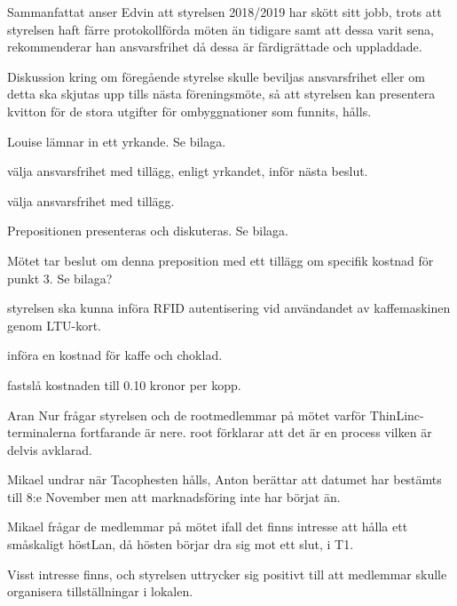 \documentclass{protokoll}
\begin{document}
Sammanfattat anser Edvin att styrelsen 2018/2019 har skött sitt jobb, trots att
styrelsen haft färre protokollförda möten än tidigare samt att dessa varit
sena, rekommenderar han ansvarsfrihet då dessa är färdigrättade och uppladdade. 


Diskussion kring om föregående styrelse skulle beviljas ansvarsfrihet eller om
detta ska skjutas upp tills nästa föreningsmöte, så att styrelsen kan 
presentera kvitton för de stora utgifter för ombyggnationer som funnits, hålls. 

Louise lämnar in ett yrkande. Se bilaga.

\begin{beslut}
  \att välja ansvarsfrihet med tillägg, enligt yrkandet, inför nästa beslut.
\end{beslut}

\begin{beslut}
  \att välja ansvarsfrihet med tillägg.
\end{beslut}

Prepositionen presenteras och diskuteras. Se bilaga. 


Mötet tar beslut om denna preposition med ett tillägg om specifik kostnad för
punkt 3. Se bilaga?

\begin{beslut}
  \att styrelsen ska kunna införa RFID autentisering vid användandet av
  kaffemaskinen genom LTU-kort.
\end{beslut}

\begin{beslut}
  \att införa en kostnad för kaffe och choklad.
\end{beslut}

\begin{beslut}
  \att fastslå kostnaden till 0.10 kronor per kopp.
\end{beslut}

Aran Nur frågar styrelsen och de rootmedlemmar på mötet varför
ThinLinc-terminalerna fortfarande är nere. root förklarar att det är en process
vilken är delvis avklarad. 

Mikael undrar när Tacophesten hålls, Anton berättar att datumet har bestämts
till 8:e November men att marknadsföring inte har börjat än. 

Mikael frågar de medlemmar på mötet ifall det finns intresse att hålla ett
småskaligt höstLan, då hösten börjar dra sig mot ett slut, i T1.  

Visst intresse finns, och styrelsen uttrycker sig positivt till att medlemmar
skulle organisera tillställningar i lokalen. 
\end{document}
